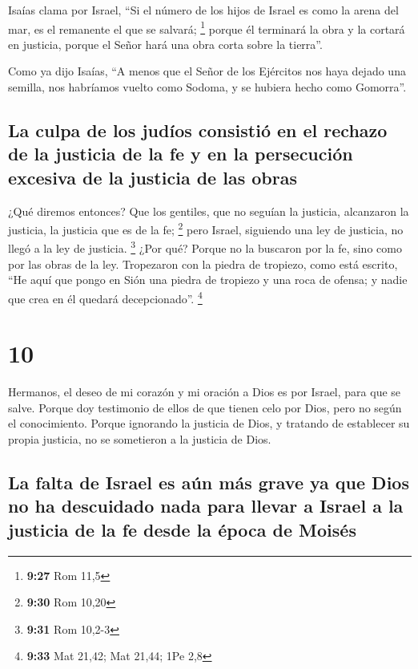  Isaías clama por Israel, ``Si el número de los hijos de
Israel es como la arena del mar, es el remanente el que se salvará;
\footnote{\textbf{9:27} Rom 11,5}  porque él terminará la
obra y la cortará en justicia, porque el Señor hará una obra corta sobre
la tierra''.

 Como ya dijo Isaías, ``A menos que el Señor de los
Ejércitos nos haya dejado una semilla, nos habríamos vuelto como Sodoma,
y se hubiera hecho como Gomorra''.

\hypertarget{la-culpa-de-los-juduxedos-consistiuxf3-en-el-rechazo-de-la-justicia-de-la-fe-y-en-la-persecuciuxf3n-excesiva-de-la-justicia-de-las-obras}{%
\subsection{La culpa de los judíos consistió en el rechazo de la
justicia de la fe y en la persecución excesiva de la justicia de las
obras}\label{la-culpa-de-los-juduxedos-consistiuxf3-en-el-rechazo-de-la-justicia-de-la-fe-y-en-la-persecuciuxf3n-excesiva-de-la-justicia-de-las-obras}}

 ¿Qué diremos entonces? Que los gentiles, que no seguían
la justicia, alcanzaron la justicia, la justicia que es de la fe;
\footnote{\textbf{9:30} Rom 10,20}  pero Israel,
siguiendo una ley de justicia, no llegó a la ley de justicia.
\footnote{\textbf{9:31} Rom 10,2-3}  ¿Por qué? Porque no
la buscaron por la fe, sino como por las obras de la ley. Tropezaron con
la piedra de tropiezo,  como está escrito, ``He aquí que
pongo en Sión una piedra de tropiezo y una roca de ofensa; y nadie que
crea en él quedará decepcionado''. \footnote{\textbf{9:33} Mat 21,42;
  Mat 21,44; 1Pe 2,8}

\hypertarget{section-9}{%
\section{10}\label{section-9}}

 Hermanos, el deseo de mi corazón y mi oración a Dios es
por Israel, para que se salve.  Porque doy testimonio de
ellos de que tienen celo por Dios, pero no según el conocimiento.
 Porque ignorando la justicia de Dios, y tratando de
establecer su propia justicia, no se sometieron a la justicia de Dios.

\hypertarget{la-falta-de-israel-es-auxfan-muxe1s-grave-ya-que-dios-no-ha-descuidado-nada-para-llevar-a-israel-a-la-justicia-de-la-fe-desde-la-uxe9poca-de-moisuxe9s}{%
\subsection{La falta de Israel es aún más grave ya que Dios no ha
descuidado nada para llevar a Israel a la justicia de la fe desde la
época de
Moisés}\label{la-falta-de-israel-es-auxfan-muxe1s-grave-ya-que-dios-no-ha-descuidado-nada-para-llevar-a-israel-a-la-justicia-de-la-fe-desde-la-uxe9poca-de-moisuxe9s}}

